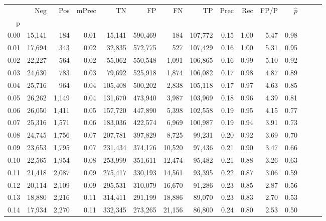 \begin{tabular}{rrrrrrrrrrrrrrr}
\toprule
{} &     Neg &    Pos & mPrec &       TN &       FP &       FN &       TP &  Prec &   Rec &  FP/P & $\hat{p}$ \\
p    &         &        &       &          &          &          &          &       &       &       &           \\
\midrule
0.00 &  15,141 &    184 &  0.01 &   15,141 &  590,469 &      184 &  107,772 &  0.15 &  1.00 &  5.47 &      0.98 \\
0.01 &  17,694 &    343 &  0.02 &   32,835 &  572,775 &      527 &  107,429 &  0.16 &  1.00 &  5.31 &      0.95 \\
0.02 &  22,227 &    564 &  0.02 &   55,062 &  550,548 &    1,091 &  106,865 &  0.16 &  0.99 &  5.10 &      0.92 \\
0.03 &  24,630 &    783 &  0.03 &   79,692 &  525,918 &    1,874 &  106,082 &  0.17 &  0.98 &  4.87 &      0.89 \\
0.04 &  25,716 &    964 &  0.04 &  105,408 &  500,202 &    2,838 &  105,118 &  0.17 &  0.97 &  4.63 &      0.85 \\
0.05 &  26,262 &  1,149 &  0.04 &  131,670 &  473,940 &    3,987 &  103,969 &  0.18 &  0.96 &  4.39 &      0.81 \\
0.06 &  26,050 &  1,411 &  0.05 &  157,720 &  447,890 &    5,398 &  102,558 &  0.19 &  0.95 &  4.15 &      0.77 \\
0.07 &  25,316 &  1,571 &  0.06 &  183,036 &  422,574 &    6,969 &  100,987 &  0.19 &  0.94 &  3.91 &      0.73 \\
0.08 &  24,745 &  1,756 &  0.07 &  207,781 &  397,829 &    8,725 &   99,231 &  0.20 &  0.92 &  3.69 &      0.70 \\
0.09 &  23,653 &  1,795 &  0.07 &  231,434 &  374,176 &   10,520 &   97,436 &  0.21 &  0.90 &  3.47 &      0.66 \\
0.10 &  22,565 &  1,954 &  0.08 &  253,999 &  351,611 &   12,474 &   95,482 &  0.21 &  0.88 &  3.26 &      0.63 \\
0.11 &  21,418 &  2,087 &  0.09 &  275,417 &  330,193 &   14,561 &   93,395 &  0.22 &  0.87 &  3.06 &      0.59 \\
0.12 &  20,114 &  2,109 &  0.09 &  295,531 &  310,079 &   16,670 &   91,286 &  0.23 &  0.85 &  2.87 &      0.56 \\
0.13 &  18,880 &  2,216 &  0.11 &  314,411 &  291,199 &   18,886 &   89,070 &  0.23 &  0.83 &  2.70 &      0.53 \\
0.14 &  17,934 &  2,270 &  0.11 &  332,345 &  273,265 &   21,156 &   86,800 &  0.24 &  0.80 &  2.53 &      0.50 \\

\end{tabular}
